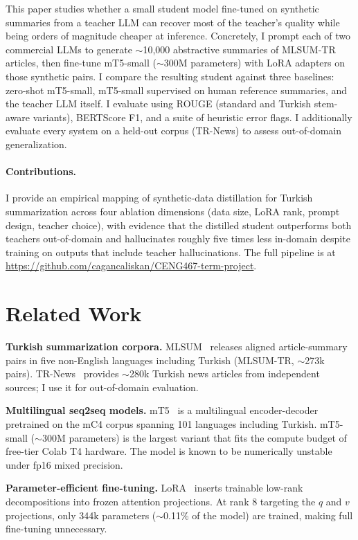 \documentclass{llncs}
\begin{document}
This paper studies whether a small student model fine-tuned on synthetic summaries from a teacher LLM can recover most of the teacher's quality while being orders of magnitude cheaper at inference. Concretely, I prompt each of two commercial LLMs to generate $\sim$10{,}000 abstractive summaries of MLSUM-TR articles, then fine-tune mT5-small (\(\sim\)300M parameters) with LoRA adapters on those synthetic pairs. I compare the resulting student against three baselines: zero-shot mT5-small, mT5-small supervised on human reference summaries, and the teacher LLM itself. I evaluate using ROUGE (standard and Turkish stem-aware variants), BERTScore F1, and a suite of heuristic error flags. I additionally evaluate every system on a held-out corpus (TR-News) to assess out-of-domain generalization.

\paragraph{Contributions.} I provide an empirical mapping of synthetic-data distillation for Turkish summarization across four ablation dimensions (data size, LoRA rank, prompt design, teacher choice), with evidence that the distilled student outperforms both teachers out-of-domain and hallucinates roughly five times less in-domain despite training on outputs that include teacher hallucinations. The full pipeline is at \url{https://github.com/cagancaliskan/CENG467-term-project}.

\section{Related Work}

\textbf{Turkish summarization corpora.} MLSUM~\cite{scialom2020mlsum} releases aligned article-summary pairs in five non-English languages including Turkish (MLSUM-TR, $\sim$273k pairs). TR-News~\cite{baykara2022trnews} provides $\sim$280k Turkish news articles from independent sources; I use it for out-of-domain evaluation.

\textbf{Multilingual seq2seq models.} mT5~\cite{xue2021mt5} is a multilingual encoder-decoder pretrained on the mC4 corpus spanning 101 languages including Turkish. mT5-small ($\sim$300M parameters) is the largest variant that fits the compute budget of free-tier Colab T4 hardware. The model is known to be numerically unstable under fp16 mixed precision.

\textbf{Parameter-efficient fine-tuning.} LoRA~\cite{hu2021lora} inserts trainable low-rank decompositions into frozen attention projections. At rank 8 targeting the $q$ and $v$ projections, only 344k parameters ($\sim$0.11\% of the model) are trained, making full fine-tuning unnecessary.
\end{document}
